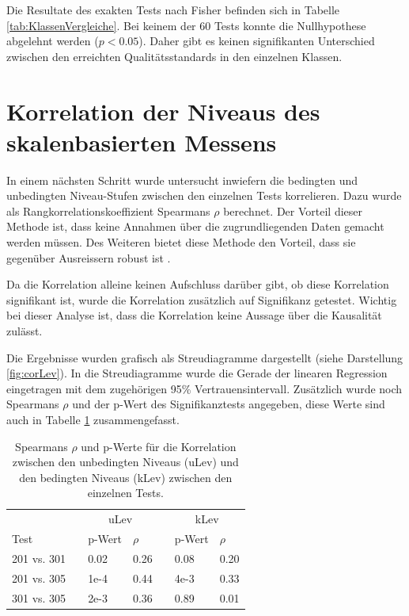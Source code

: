 Die Resultate des exakten Tests nach Fisher befinden sich in Tabelle \ref{tab:KlassenVergleiche}. Bei keinem der 60 Tests konnte die Nullhypothese abgelehnt werden ($p < 0.05$). Daher gibt es keinen signifikanten Unterschied zwischen den erreichten Qualitätsstandards in den einzelnen Klassen.  

\section{Korrelation der Niveaus des skalenbasierten Messens}

In einem nächsten Schritt wurde untersucht inwiefern die bedingten und unbedingten Niveau-Stufen zwischen den einzelnen Tests korrelieren. Dazu wurde als Rangkorrelationskoeffizient Spearmans $\rho$ berechnet. Der Vorteil dieser Methode ist, dass keine Annahmen über die zugrundliegenden Daten gemacht werden müssen. Des Weiteren bietet diese Methode den Vorteil, dass sie gegenüber Ausreissern robust ist \citep{Kowalski1972}. 

Da die Korrelation alleine keinen Aufschluss darüber gibt, ob diese Korrelation signifikant ist, wurde die Korrelation zusätzlich auf Signifikanz getestet. Wichtig bei dieser Analyse ist, dass die Korrelation keine Aussage über die Kausalität zulässt.


Die Ergebnisse wurden grafisch als Streudiagramme dargestellt (siehe Darstellung \ref{fig:corLev}). In die Streudiagramme wurde die Gerade der linearen Regression eingetragen mit dem zugehörigen 95\% Vertrauensintervall. Zusätzlich wurde noch Spearmans $\rho$ und der p-Wert des Signifikanztests angegeben, diese Werte sind auch in Tabelle \ref{tab:CorNiveau} zusammengefasst.



\begin{table}[htbp]
  \centering
\begin{tabular}{@{}lllllll@{}}
\toprule
 &&  \multicolumn{2}{c}{uLev} &&  \multicolumn{2}{c}{kLev}\\ 
 \cmidrule{3-4}  \cmidrule{6-7}
 Test && p-Wert & $\rho$ && p-Wert & $\rho$  \\ 
\midrule
 201 vs. 301 &&   0.02 & 0.26 && 0.08 & 0.20    \\ 
 201 vs. 305 &&   1e-4 & 0.44 && 4e-3 & 0.33      \\
 301 vs. 305 &&   2e-3 & 0.36 && 0.89 & 0.01    \\
\bottomrule
\end{tabular} 
  \caption{Spearmans $\rho$ und p-Werte für die Korrelation zwischen den unbedingten Niveaus (uLev) und den bedingten Niveaus (kLev) zwischen den einzelnen Tests.  }
  \label{tab:CorNiveau}
\end{table}
 
